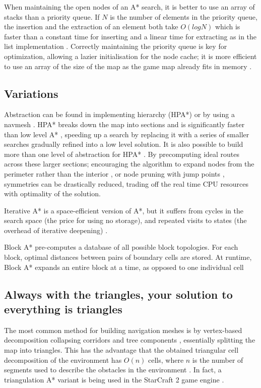 \documentclass{scrartcl}
\begin{document}
When maintaining the open nodes of an A* search, it is better to use an array of stacks than a priority queue. If $N$ is the number of elements in the priority queue, the insertion and the extraction of an element both take $O(log N)$ which is faster than a constant time for inserting and a linear time for extracting as in the list implementation \cite{cazenave2006optimizations}.  Correctly maintaining the priority queue is key for optimization, allowing a lazier initialisation for the node cache; it is more efficient to use an array of the size of the map as the game map already fits in memory \cite{cazenave2006optimizations}.

\subsection*{Variations}

Abstraction can be found in implementing hierarchy (HPA*) or by using a navmesh \cite{cui2011based}.  HPA* breaks down the map into sections and is significantly faster than low level A* \cite{botea2004near}, speeding up a search by replacing it with a series of smaller searches \cite{botea2013pathfinding} gradually refined into a low level solution.  It is also possible to build more than one level of abstraction for HPA* \cite {jansen2007hpa}. By precomputing ideal routes across these larger sections; encouraging the algorithm to expand nodes from the perimeter rather than the interior \cite{harabor2012fast}, or node pruning with jump points \cite{harabor2011online}, symmetries can be drastically reduced, trading off the real time CPU resources with optimality of the solution. 

Iterative A* is a space-efficient version of A*, but it suffers from cycles in the search space (the price for using no storage), and repeated visits to states (the overhead of iterative deepening) \cite{bjornsson2005fringe}.

Block A* pre-computes a database of all possible block topologies.  For each block, optimal distances between pairs of boundary cells are stored.  At runtime, Block A* expands an entire block at a time, as opposed to one individual cell \cite{botea2013pathfinding}

\subsection*{Always with the triangles, your solution to everything is triangles}

The most common method for building navigation meshes is by vertex-based decomposition \cite{hale2009full} collapsing corridors and tree components \cite{demyen2006efficient}, essentially splitting the map into triangles.  This has the advantage that the obtained triangular cell decomposition of the environment has $O(n)$ cells, where $n$ is the number of segments used to describe the obstacles in the environment \cite{kallmann2010navigation}.  In fact, a triangulation A* variant is being used in the StarCraft 2 game engine \cite{ontanon2013survey}.
\end{document}
